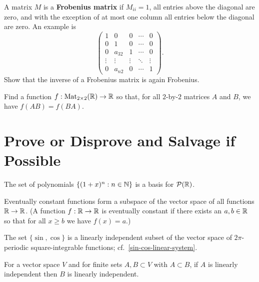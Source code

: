 \documentclass{homework}
\begin{document}
\begin{problem}\label{frobenius-matrix}A matrix $M$ is a \textbf{Frobenius matrix} if $M_{ii} = 1$, all
  entries above the diagonal are zero, and with the exception of at
  most one column all entries below the diagonal are zero.  An example is
  \[\begin{pmatrix}
      1&0&0&\cdots &0\\
      0&1&0&\cdots &0\\
      0&a_{32}&1&\cdots &0\\
      \vdots &\vdots &\vdots &\ddots &\vdots \\
      0&a_{n2}&0&\cdots &1
    \end{pmatrix}.\]
  Show that the inverse of a Frobenius matrix is again Frobenius.
\end{problem}

\begin{problem}
  Find a function $f : \operatorname{Mat}_{2\times 2}(\mathbb{R}) \to \mathbb{R}$ so that, for all
  $2$-by-$2$ matrices $A$ and $B$, we have $f(AB) = f(BA)$.
\end{problem}

\section{Prove or Disprove and Salvage if Possible}

\begin{problem}
  The set of polynomials $\{ (1+x)^n : n \in \mathbb{N} \}$ is a basis for
  $\mathcal{P}(\mathbb{R})$.
\end{problem}

\begin{problem}
  Eventually constant functions form a subspace of the vector space of
  all functions $\mathbb{R} \to \mathbb{R}$.  (A function $f : \mathbb{R} \to \mathbb{R}$ is eventually
  constant if there exists an $a,b \in \mathbb{R}$ so that for all $x \geq b$
  we have $f(x) = a$.)
\end{problem}

\begin{problem}\label{sin-cos-indie}The set $\{ \sin, \cos \}$ is a linearly independent subset of the
  vector space of $2\pi$-periodic square-integrable functions;
  cf.~\ref{sin-cos-linear-system}.
\end{problem}

\begin{problem}
  For a vector space $V$ and for finite sets $A, B \subset V$ with
  $A \subset B$, if $A$ is linearly independent then $B$ is linearly
  independent.
\end{problem}
\end{document}
